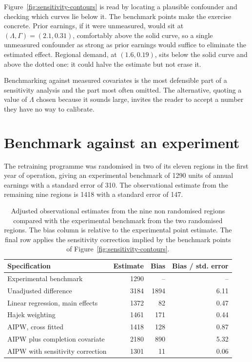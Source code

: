 Figure~\ref{fig:sensitivity-contours} is read by locating a plausible confounder
and checking which curves lie below it. The benchmark points make the exercise
concrete. Prior earnings, if it were unmeasured, would sit at
$(\Lambda, \Gamma) = (2.1, 0.31)$, comfortably above the solid curve, so a
single unmeasured confounder as strong as prior earnings would suffice to
eliminate the estimated effect. Regional demand, at $(1.6, 0.19)$, sits below
the solid curve and above the dotted one: it could halve the estimate but not
erase it.

\begin{remark}
\label{rem:benchmark-honesty}
Benchmarking against measured covariates is the most defensible part of a
sensitivity analysis and the part most often omitted. The alternative, quoting a
value of $\Lambda$ chosen because it sounds large, invites the reader to accept
a number they have no way to calibrate.
\end{remark}

\section{Benchmark against an experiment}
\label{sec:sens-benchmark}

The retraining programme was randomised in two of its eleven regions in the
first year of operation, giving an experimental benchmark of 1290 units of
annual earnings with a standard error of 310. The observational estimate from
the remaining nine regions is 1418 with a standard error of 147.

\begin{table}[t]
\centering
\caption[Observational estimates against the experimental benchmark]{Adjusted
observational estimates from the nine non randomised regions compared with the
experimental benchmark from the two randomised regions. The bias column is
relative to the experimental point estimate. The final row applies the
sensitivity correction implied by the benchmark points of
Figure~\ref{fig:sensitivity-contours}.}
\label{tab:benchmark}
\begin{tabular}{lrrr}
\toprule
Specification & Estimate & Bias & Bias / std. error \\
\midrule
Experimental benchmark            & 1290 & --   & --   \\
Unadjusted difference             & 3184 & 1894 & 6.11 \\
Linear regression, main effects   & 1372 & 82   & 0.47 \\
Hajek weighting                   & 1461 & 171  & 0.44 \\
AIPW, cross fitted                & 1418 & 128  & 0.87 \\
AIPW plus completion covariate    & 2180 & 890  & 5.32 \\
AIPW with sensitivity correction  & 1301 & 11   & 0.06 \\
\bottomrule
\end{tabular}
\end{table}


